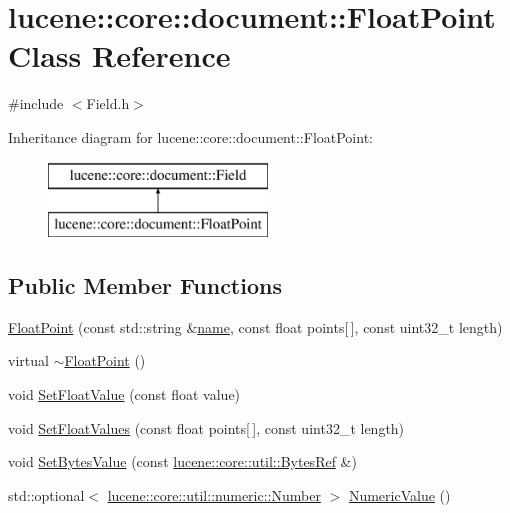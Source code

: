 \hypertarget{classlucene_1_1core_1_1document_1_1FloatPoint}{}\section{lucene\+:\+:core\+:\+:document\+:\+:Float\+Point Class Reference}
\label{classlucene_1_1core_1_1document_1_1FloatPoint}


{\ttfamily \#include $<$Field.\+h$>$}

Inheritance diagram for lucene\+:\+:core\+:\+:document\+:\+:Float\+Point\+:\begin{figure}[H]
\begin{center}
\leavevmode
\includegraphics[height=2.000000cm]{classlucene_1_1core_1_1document_1_1FloatPoint}
\end{center}
\end{figure}
\subsection*{Public Member Functions}
\begin{DoxyCompactItemize}
\item 
\mbox{\hyperlink{classlucene_1_1core_1_1document_1_1FloatPoint_a5ea967634ff73cdde9915e722bc823fc}{Float\+Point}} (const std\+::string \&\mbox{\hyperlink{classlucene_1_1core_1_1document_1_1Field_a52f673f3b3abb14b180f5159f4726537}{name}}, const float points\mbox{[}$\,$\mbox{]}, const uint32\+\_\+t length)
\item 
virtual \mbox{\hyperlink{classlucene_1_1core_1_1document_1_1FloatPoint_af7445c4ea46294911dce52ae13d4b62a}{$\sim$\+Float\+Point}} ()
\item 
void \mbox{\hyperlink{classlucene_1_1core_1_1document_1_1FloatPoint_a4e1f81bce5f905e267a32c4882faf90e}{Set\+Float\+Value}} (const float value)
\item 
void \mbox{\hyperlink{classlucene_1_1core_1_1document_1_1FloatPoint_a37fb83ede21d310e7bda0cbd072650b4}{Set\+Float\+Values}} (const float points\mbox{[}$\,$\mbox{]}, const uint32\+\_\+t length)
\item 
void \mbox{\hyperlink{classlucene_1_1core_1_1document_1_1FloatPoint_a8862567e2ebfd0b8192eaec0967a943a}{Set\+Bytes\+Value}} (const \mbox{\hyperlink{classlucene_1_1core_1_1util_1_1BytesRef}{lucene\+::core\+::util\+::\+Bytes\+Ref}} \&)
\item 
std\+::optional$<$ \mbox{\hyperlink{classlucene_1_1core_1_1util_1_1numeric_1_1Number}{lucene\+::core\+::util\+::numeric\+::\+Number}} $>$ \mbox{\hyperlink{classlucene_1_1core_1_1document_1_1FloatPoint_ac2f070785fcce64c8214bb851fb6087c}{Numeric\+Value}} ()
\end{DoxyCompactItemize}

